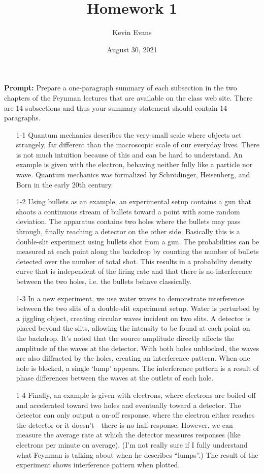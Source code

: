 \documentclass{homework}
\title{Homework 1}
\author{Kevin Evans}
\date{August 30, 2021}
\begin{document}
	\maketitle
	\textbf{Prompt: } Prepare a one-paragraph summary of each subsection in the two chapters of the Feynman lectures that are available on the class web site. There are 14 subsections and thus your summary statement should contain 14 paragraphs.
	
	\begin{enumerate}
		\item[1-1]  Quantum mechanics describes the very-small scale where objects act strangely, far different than the macroscopic scale of our everyday lives. There is not much intuition because of this and can be hard to understand. An example is given with the electron, behaving neither fully like a particle nor wave. Quantum mechanics was formalized by Schr\"odinger, Heisenberg, and Born in the early 20th century. 
		
		\item[1-2] Using bullets as an example, an experimental setup contains a gun that shoots a continuous stream of bullets toward a point with some random deviation. The apparatus contains two holes where the bullets may pass through, finally reaching a detector on the other side. Basically this is a double-slit experiment using bullets shot from a gun. The probabilities can be measured at each point along the backdrop by counting the number of bullets detected over the number of total shot. This results in a probability density curve that is independent of the firing rate and that there is no interference between the two holes, i.e. the bullets behave classically.
		
		\item[1-3] In a new experiment, we use water waves to demonstrate interference between the two slits of a double-slit experiment setup. Water is perturbed by a jiggling object, creating circular waves incident on two slits. A detector is placed beyond the slits, allowing the intensity to be found at each point on the backdrop. It's noted that the source amplitude directly affects the amplitude of the waves at the detector. With both holes unblocked, the waves are also diffracted by the holes, creating an interference pattern. When one hole is blocked, a single `lump' appears. The interference pattern is a result of phase differences between the waves at the outlets of each hole.
		
		\item[1-4] Finally, an example is given with electrons, where electrons are boiled off and accelerated toward two holes and eventually toward a detector. The detector can only output a on-off response, where the electron either reaches the detector or it doesn't---there is no half-response. However, we can measure the average rate at which the detector measures responses (like electrons per minute on average). (I'm not really sure if I fully understand what Feynman is talking about when he describes ``lumps''.) The result of the experiment shows interference pattern when plotted.
		

\end{enumerate}
\end{document}
